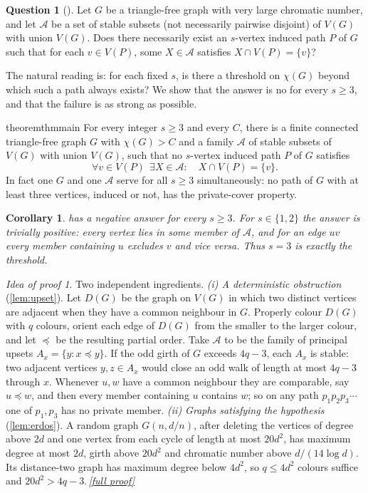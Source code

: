 \documentclass[11pt,a4paper]{article}
\theoremstyle{plain}
\newtheorem{corollary}[theorem]{Corollary}
\theoremstyle{definition}
\newtheorem{question}[theorem]{Question}
\theoremstyle{remark}
\newtheorem*{proofidea}{Idea of proof}
\newcommand{\fullproofref}[1]{\,\hyperref[#1]{\textit{[full proof]}}}
\newcommand{\cA}{\mathcal A}
\begin{document}
\begin{question}[{\cite[Conclusion]{SS17}}]\label{q:ss}
Let $G$ be a triangle-free graph with very large chromatic number, and let $\cA$ be a set of stable subsets (not necessarily pairwise disjoint) of $V(G)$ with union $V(G)$. Does there necessarily exist an $s$-vertex induced path $P$ of $G$ such that for each $v\in V(P)$, some $X\in\cA$ satisfies $X\cap V(P)=\{v\}$?
\end{question}

The natural reading is: for each fixed $s$, is there a threshold on $\chi(G)$ beyond which such a path always exists? We show that the answer is no for every $s\ge3$, and that the failure is as strong as possible.

\begin{restatable}{theorem}{thmmain}\label{thm:main}
For every integer $s\ge3$ and every $C$, there is a finite connected triangle-free graph $G$ with $\chi(G)>C$ and a family $\cA$ of stable subsets of $V(G)$ with union $V(G)$, such that no $s$-vertex induced path $P$ of $G$ satisfies
\[
 \forall v\in V(P)\ \ \exists X\in\cA:\quad X\cap V(P)=\{v\}.
\]
In fact one $G$ and one $\cA$ serve for all $s\ge3$ simultaneously: no path of $G$ with at least three vertices, induced or not, has the private-cover property.
\end{restatable}

\begin{corollary}\label{cor:answer}
 has a negative answer for every $s\ge3$. For $s\in\{1,2\}$ the answer is trivially positive: every vertex lies in some member of $\cA$, and for an edge $uv$ every member containing $u$ excludes $v$ and vice versa. Thus $s=3$ is exactly the threshold.
\end{corollary}

\begin{proofidea}
Two independent ingredients. \emph{(i) A deterministic obstruction} (\cref{lem:upset}). Let $D(G)$ be the graph on $V(G)$ in which two distinct vertices are adjacent when they have a common neighbour in $G$. Properly colour $D(G)$ with $q$ colours, orient each edge of $D(G)$ from the smaller to the larger colour, and let $\preceq$ be the resulting partial order. Take $\cA$ to be the family of principal upsets $A_x=\{y:x\preceq y\}$. If the odd girth of $G$ exceeds $4q-3$, each $A_x$ is stable: two adjacent vertices $y,z\in A_x$ would close an odd walk of length at most $4q-3$ through $x$. Whenever $u,w$ have a common neighbour they are comparable, say $u\preceq w$, and then every member containing $u$ contains $w$; so on any path $p_1p_2p_3\cdots$ one of $p_1,p_3$ has no private member. \emph{(ii) Graphs satisfying the hypothesis} (\cref{lem:erdos}). A random graph $G(n,d/n)$, after deleting the vertices of degree above $2d$ and one vertex from each cycle of length at most $20d^2$, has maximum degree at most $2d$, girth above $20d^2$ and chromatic number above $d/(14\log d)$. Its distance-two graph has maximum degree below $4d^2$, so $q\le4d^2$ colours suffice and $20d^2>4q-3$.\fullproofref{pf:main}
\end{proofidea}
\end{document}
